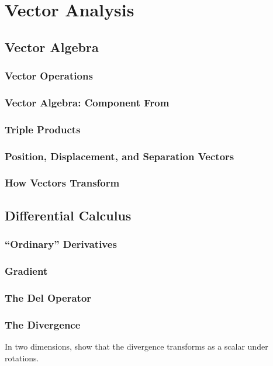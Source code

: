 \chapter{Vector Analysis}

\section{Vector Algebra}
    \subsection{Vector Operations}
    \subsection{Vector Algebra: Component From}
    \subsection{Triple Products}
    \subsection{Position, Displacement, and Separation Vectors}
    \subsection{How Vectors Transform}

\section{Differential Calculus}
    \subsection{``Ordinary'' Derivatives}
    \subsection{Gradient}
    \subsection{The Del Operator}
    \subsection{The Divergence}
        \begin{prob}[1.17]
            In two dimensions, 
            show that the divergence transforms as a scalar 
            under rotations.
        \end{prob}

